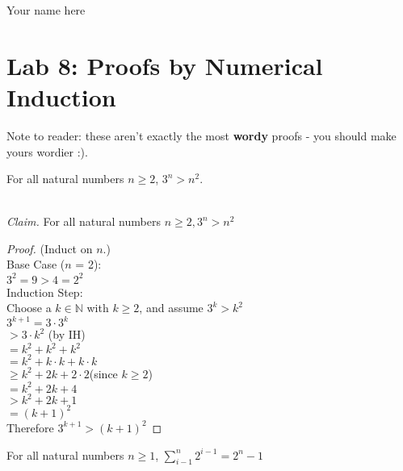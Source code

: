 \documentclass[answers,12pt]{exam}
\newcommand\tab[1][1cm]{\hspace*{#1}}
\begin{document}
	\begin{flushright}Your name here\end{flushright}
		\section*{Lab 8: Proofs by Numerical Induction}
Note to reader: these aren't exactly the most \textbf{wordy} proofs - you should make yours wordier :).
\begin{questions}


\question[some]
For all natural numbers $n \geq 2$, $3^{n} > n^{2}$.

\begin{solution} \\
\textit{Claim.} For all natural numbers $n \geq 2, 3^n > n^2$ \\
		\begin{proof}(Induct on $n$.)\\
			Base Case ($n$ = 2):\\
			\tab $3^2 = 9 > 4 = 2^2$\\
			Induction Step:\\
			\tab Choose a $k \in \mathbb{N}$ with $k \geq 2$, and assume $3^k > k^2$\\
			\tab \tab \tab $3^{k+1} = 3 \cdot 3^k$\\
			\tab \tab \tab $> 3 \cdot k^2$ \hfill (by IH)\\
			\tab \tab \tab $= k^2 + k^2 + k^2$\\
			\tab \tab \tab $= k^2 + k \cdot k + k \cdot k$\\
			\tab \tab \tab $\geq k^2 + 2k + 2 \cdot 2$\hfill (since $k \geq 2$)\\
			\tab \tab \tab $= k^2 + 2k + 4$\\
			\tab \tab \tab $> k^2 + 2k + 1$\\
			\tab \tab \tab $= (k+1)^2$\\
			\tab Therefore $3^{k+1} > (k+1)^2$
		\end{proof}
\end{solution}
  
\question[some]
For all natural numbers $n \geq 1$, $\displaystyle\sum_{i-1}^{n} 2^{i-1} = 2^{n} - 1$\\


\end{questions}
\end{document}
